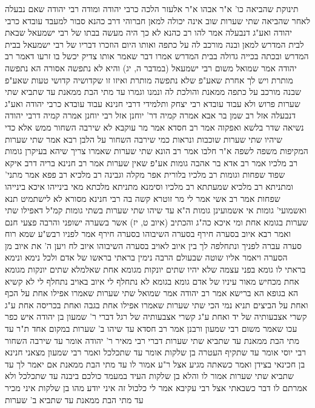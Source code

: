 \documentclass[12pt, openany]{book}
\begin{document}
{תינוקת שהביאה כו' א"ר אבהו א"ר אלעזר הלכה כרבי יהודה 
ומודה רבי יהודה שאם נבעלה לאחר שהביאה שתי שערות שוב אינה יכולה למאן 
חברוהי דרב כהנא סבור למעבד עובדא כרבי יהודה ואע"ג דנבעלה 
אמר להו רב כהנא לא כך היה מעשה בבתו של רבי ישמעאל שבאת לבית המדרש למאן ובנה מורכב לה על כתפה ואותו היום הוזכרו דבריו של רבי ישמעאל בבית המדרש ובכתה בכייה גדולה בבית המדרש 
אמרו דבר שאמר אותו צדיק יכשל בו זרעו 
דאמר רב יהודה אמר שמואל משום רבי ישמעאל (במדבר ה, יג) והיא לא נתפשה אסורה הא נתפשה מותרת ויש לך אחרת שאע"פ שלא נתפשה מותרת ואיזו זו שקדושיה קדושי טעות שאע"פ שבנה מורכב על כתפה ממאנת והולכת לה 
ונמנו וגמרו עד מתי הבת ממאנת עד שתביא שתי שערות פרוש ולא עבוד עובדא 
רבי יצחק ותלמידי דרבי חנינא עבוד עובדא כרבי יהודה ואע"ג דנבעלה אזל רב שמן בר אבא אמרה קמיה דר' יוחנן אזל רבי יוחנן אמרה קמיה דרבי יהודה נשיאה שדר בלשא ואפקוה 
אמר רב חסדא אמר מר עוקבא לא שירבה השחור ממש אלא כדי שיהיו שתי שערות שוכבות ונראות כמי שירבה השחור על הלבן רבא אמר שתי שערות המקיפות משפה לשפה 
א"ר חלבו אמר רב הונא שתי שערות שאמרו צריך שיהא בעיקרן גומות רב מלכיו אמר רב אדא בר אהבה גומות אע"פ שאין שערות 
אמר רב חנינא בריה דרב איקא שפוד שפחות וגומות רב מלכיו בלורית אפר מקלה וגבינה רב מלכיא 
רב פפא אמר מתני' ומתניתא רב מלכיא שמעתתא רב מלכיו וסימנא מתניתא מלכתא 
מאי בינייהו איכא בינייהו שפחות 
אמר רב אשי אמר לי מר זוטרא קשה בה רבי חנינא מסורא לא לישתמיט תנא ואשמועי' גומות אי אשמועינן גומות ה"א עד שיהו שתי שערות בשתי גומות קמ"ל דאפילו שתי שערות בגומא אחת 
ומי איכא כה"ג והכתיב (איוב ט, יז) אשר בשערה ישופני והרבה פצעי חנם ואמר רבא איוב בסערה חירף בסערה השיבוהו בסערה חירף אמר לפניו רבש"ע שמא רוח סערה עברה לפניך ונתחלפה לך בין איוב לאויב בסערה השיבוהו {איוב לח } ויען ה' את
איוב מן הסערה ויאמר אליו שוטה שבעולם הרבה נימין בראתי בראשו של אדם ולכל נימא ונימא בראתי לו גומא בפני עצמה שלא יהיו שתים יונקות מגומא אחת שאלמלא שתים יונקות מגומא אחת מכחיש מאור עיניו של אדם גומא בגומא לא נתחלף לי איוב באויב נתחלף לי 
לא קשיא הא בגופא הא ברישא 
אמר רב יהודה אמר שמואל שתי שערות שאמרו אפילו אחת על הכף ואחת על הביצים 
תניא נמי הכי שתי שערות שאמרו אפילו אחת בגבה ואחת בכריסה אחת ע"ג קשרי אצבעותיה של יד ואחת ע"ג קשרי אצבעותיה של רגל דברי ר' שמעון בן יהודה איש כפר עכו שאמר משום רבי שמעון ורבנן אמר רב חסדא עד שיהו ב' שערות במקום אחד 
ת"ר עד מתי הבת ממאנת עד שתביא שתי שערות דברי רבי מאיר ר' יהודה אומר עד שירבה השחור רבי יוסי אומר עד שתקיף העטרה בן שלקות אומר עד שתכלכל 
ואמר רבי שמעון מצאני חנינא בן חכינאי בצידן ואמר כשאתה מגיע אצל ר"ע אמור לו עד מתי הבת ממאנת אם יאמר לך עד שתביא שתי שערות אמור לו והלא בן שלקות העיד במעמד כולכם ביבנה עד שתכלכל ולא אמרתם לו דבר 
כשבאתי אצל רבי עקיבא אמר לי כלכול זה איני יודע מהו בן שלקות איני מכיר עד מתי הבת ממאנת עד שתביא ב' שערות
}
\end{document}
